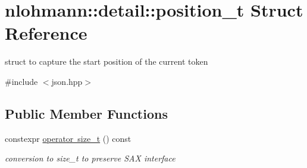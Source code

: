 \hypertarget{structnlohmann_1_1detail_1_1position__t}{}\section{nlohmann\+:\+:detail\+:\+:position\+\_\+t Struct Reference}
\label{structnlohmann_1_1detail_1_1position__t}


struct to capture the start position of the current token  




{\ttfamily \#include $<$json.\+hpp$>$}

\subsection*{Public Member Functions}
\begin{DoxyCompactItemize}
\item 
\mbox{\label{structnlohmann_1_1detail_1_1position__t_ac9ad1e0f143f162e2e0c979cd678d683}} 
constexpr \mbox{\hyperlink{structnlohmann_1_1detail_1_1position__t_ac9ad1e0f143f162e2e0c979cd678d683}{operator size\+\_\+t}} () const
\begin{DoxyCompactList}\small\item\em conversion to size\+\_\+t to preserve S\+AX interface \end{DoxyCompactList}\end{DoxyCompactItemize}
